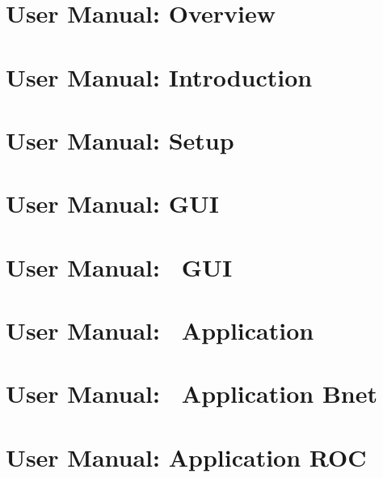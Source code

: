 \chapter[DABC User Manual: Overview]{\dabc\ User Manual: Overview}
 \cleardoublepage
\chapter[DABC User Manual: Introduction]{\dabc\ User Manual: Introduction}
 \cleardoublepage
\chapter[DABC User Manual: Setup]{\dabc\ User Manual: Setup}
 \cleardoublepage
\chapter[DABC User Manual: GUI]{\dabc\ User Manual: GUI}
 \cleardoublepage
\chapter[DABC User Manual: MBS GUI]{\dabc\ User Manual: \mbs\ GUI}
 \cleardoublepage
\chapter[DABC User Manual: DABC Application MBS]{\dabc\ User Manual: \dabc\ Application \mbs}
 \cleardoublepage
\chapter[DABC User Manual: DABC Application Bnet]{\dabc\ User Manual: \dabc\ Application Bnet}
 \cleardoublepage
\chapter[DABC User Manual: DABC Application ROC]{\dabc\ User Manual: Application ROC}
 \cleardoublepage


